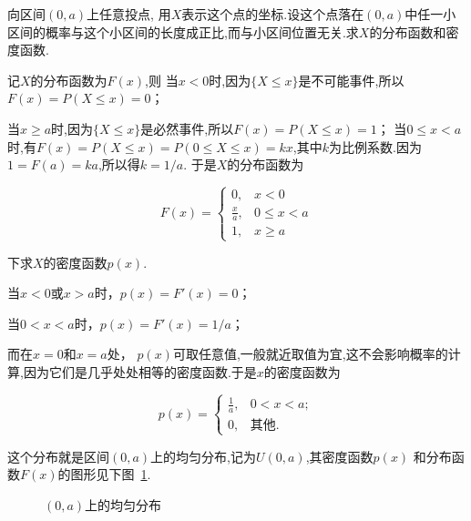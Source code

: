 \begin{example}
	向区间$ (0,a) $上任意投点, 用$X$表示这个点的坐标.设这个点落在$ (0,a) $中任一小区间的概率与这个小区间的长度成正比,而与小区间位置无关.求$ X $的分布函数和密度函数.
\end{example}

\begin{solution}	
	记$ X $的分布函数为$ F(x) $,则
	当$ x<0 $时,因为$\{X \leqslant x\}$是不可能事件,所以$F(x)=P(X \leqslant x)=0$；
	
	当$x \geqslant a$时,因为$\{ X \leqslant x \}$是必然事件,所以$F(x)=P(X \leqslant x)=1$；
	当$0 \leqslant x<a$时,有$F(x)=P(X \leqslant x)=P(0 \leqslant X \leqslant x)=k x$,其中$ k $为比例系数.因为$ 1=F(a)=ka $,所以得$ k=1/a $.
	于是$ X $的分布函数为
	
	\[
	F(x) = \begin{cases} 0, & {x<0} \\
      \frac{x}{a}, & 0 \leqslant x<a \\
      1, & x \geqslant a
      \end{cases}
	\]
	
	
	下求$ X $的密度函数$ p(x) $.
	
	当$ x<0 $或$ x>a $时，$ p(x)=F'(x)=0 $；
	
	当$ 0<x<a $时，$ p(x)=F'(x)=1/a $；
	
	而在$ x=0 $和$ x=a $处， $ p(x) $可取任意值,一般就近取值为宜,这不会影响概率的计算,因为它们是几乎处处相等的密度函数.于是$ x $的密度函数为
	
	\[
	p(x)=\begin{cases}
	\frac{1}{a}, & 0<x<a; \\
	0, & \text{其他}.
	\end{cases}
	\]
	
	这个分布就是区间$ (0,a) $上的均匀分布,记为$ U(0,a) $,其密度函数$ p(x) $
	和分布函数$ F(x) $的图形见下图~\ref{fig:2-1-10}.
\end{solution}



\begin{figure}[!ht]
  \centering
{}\hspace{2cm}
\caption{$(0,a)$上的均匀分布}\label{fig:2-1-10}
\end{figure}


